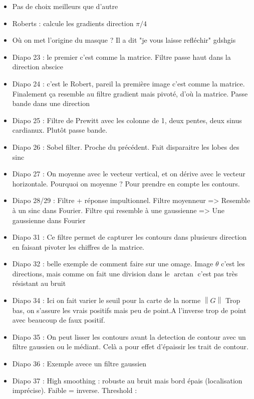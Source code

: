 \documentclass{article}
\theoremstyle{plain}%
\theoremstyle{definition}
\theoremstyle{remark}
\begin{document}
\begin{itemize}
    \item Pas de choix meilleurs que d'autre
    \item Roberts : calcule les gradients direction $ \pi /4 $ 
    \item Où on met l'origine du masque ? Il a dit "je vous laisse refléchir" gdshgis
    \item Diapo 23 : le premier c'est comme la matrice. Filtre passe haut dans la direction abscice
    \item Diapo 24 : c'est le Robert, pareil la première image c'est comme la matrice. Finalement ça resemble au filtre gradient mais pivoté, d'où la matrice. Passe bande dans une direction
    \item Diapo 25 : Filtre de Prewitt avec les colonne de 1, deux pentes, deux sinus cardianux. Plutôt passe bande.
    \item Diapo 26 : Sobel filter. Proche du précédent. Fait disparaitre les lobes des sinc
    \item Diapo 27 : On moyenne avec le vecteur vertical, et on dérive avec le vecteur horizontale. Pourquoi on moyenne ? Pour prendre en compte les contours.
    \item Diapo 28/29 : Filtre + réponse impultionnel. Filtre moyenneur => Resemble à un sinc dans Fourier. Filtre qui resemble à une gaussienne => Une gaussienne dans Fourier
    \item Diapo 31 : Ce filtre permet de capturer les contours dans plusieurs direction en faisant pivoter les chiffres de la matrice. 
    \item Diapo 32 : belle exemple de comment faire sur une omage. Image $ \theta  $ c'est les directions, mais comme on fait une division dans le $ \arctan  $ c'est pas très résistant au bruit
    \item Diapo 34 : Ici on fait varier le seuil pour la carte de la norme $ \left\| G \right\|  $  Trop bas, on s'assure les vrais positifs mais peu de point.A l'inverse trop de point avec beaucoup de faux positif. 
    \item Diapo 35 : On peut lisser les contours avant la detection de contour avec un filtre gaussien ou le médiant. Celà a pour effet d'épaissir les trait de contour.
    \item Diapo 36 : Exemple avece un filtre gaussien
    \item Diapo 37 : High smoothing : robuste au bruit mais bord épais (localisation imprécise). Faible = inverse. Threshold : 
\end{itemize}
\end{document}
